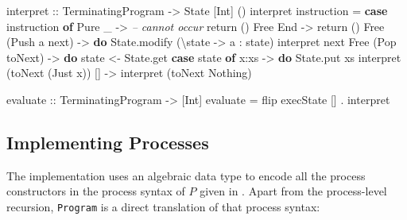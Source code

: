 \documentclass[runningheads,plain]{llncs}
\newenvironment{Shaded}{}{}
\newcommand{\KeywordTok}[1]{\textcolor[rgb]{0.00,0.44,0.13}{\textbf{#1}}}
\newcommand{\DataTypeTok}[1]{\textcolor[rgb]{0.56,0.13,0.00}{#1}}
\newcommand{\CommentTok}[1]{\textcolor[rgb]{0.38,0.63,0.69}{\textit{#1}}}
\newcommand{\OtherTok}[1]{\textcolor[rgb]{0.00,0.44,0.13}{#1}}
\newcommand{\FunctionTok}[1]{\textcolor[rgb]{0.02,0.16,0.49}{#1}}
\newcommand{\NormalTok}[1]{#1}
\begin{document}
\begin{Shaded}
\begin{Highlighting}[]
\OtherTok{interpret ::} \DataTypeTok{TerminatingProgram} \OtherTok{->} \DataTypeTok{State}\NormalTok{ [}\DataTypeTok{Int}\NormalTok{] () }
\NormalTok{interpret instruction }\FunctionTok{=} 
    \KeywordTok{case}\NormalTok{ instruction }\KeywordTok{of}
        \DataTypeTok{Pure}\NormalTok{ _ }\OtherTok{->} 
            \CommentTok{-- cannot occur}
\NormalTok{            return () }
        \DataTypeTok{Free} \DataTypeTok{End} \OtherTok{->} 
\NormalTok{            return () }
        \DataTypeTok{Free}\NormalTok{ (}\DataTypeTok{Push}\NormalTok{ a next) }\OtherTok{->} \KeywordTok{do} 
\NormalTok{            State.modify (\textbackslash{}state }\OtherTok{->}\NormalTok{ a }\FunctionTok{:}\NormalTok{ state)}
\NormalTok{            interpret next}
        \DataTypeTok{Free}\NormalTok{ (}\DataTypeTok{Pop}\NormalTok{ toNext) }\OtherTok{->} \KeywordTok{do}
\NormalTok{            state }\OtherTok{<-}\NormalTok{ State.get}
            \KeywordTok{case}\NormalTok{ state }\KeywordTok{of} 
\NormalTok{                x}\FunctionTok{:}\NormalTok{xs }\OtherTok{->} \KeywordTok{do}
\NormalTok{                    State.put xs}
\NormalTok{                    interpret (toNext (}\DataTypeTok{Just}\NormalTok{ x))}
\NormalTok{                [] }\OtherTok{->} 
\NormalTok{                    interpret (toNext }\DataTypeTok{Nothing}\NormalTok{)}

\OtherTok{evaluate ::} \DataTypeTok{TerminatingProgram} \OtherTok{->}\NormalTok{ [}\DataTypeTok{Int}\NormalTok{] }
\NormalTok{evaluate }\FunctionTok{=}\NormalTok{ flip execState [] }\FunctionTok{.}\NormalTok{ interpret }
\end{Highlighting}
\end{Shaded}


\subsection{Implementing Processes}
The implementation uses an algebraic data type %
to encode all the process constructors in the process syntax of $P$ given in . 
Apart from the process-level recursion, \texttt{Program} is a direct translation of that process syntax:
\end{document}
